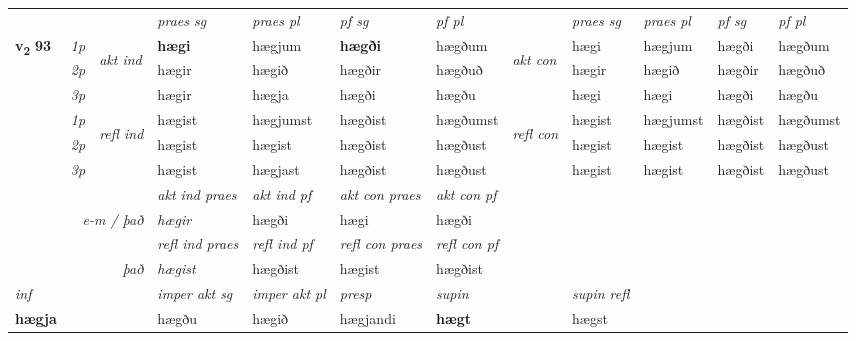 \begin{longtable}[l]{X>{\footnotesize\itshape}llXXXXlXXXX}
 & &   & \textit{praes sg}  & \textit{praes pl}    & \textit{ pf sg} & \textit{pf pl} & & \textit{praes sg}  & \textit{praes pl}    & \textit{pf sg} & \textit{pf pl }  \\ \cmidrule{4-7} \cmidrule{9-12}
 \multirow{2}{*}{{{\textbf{v{\textsubscript{2}}} \Large{\textbf{93}}}}}  & 1p & \multirow{3}{*}{\begin{turn}{90}\textit{akt ind}\end{turn}} & \textbf{hægi} & hægjum & \textbf{hægði} & hægðum & \multirow{3}{*}{\begin{turn}{90}\textit{akt con}\end{turn}} &hægi & hægjum & hægði & hægðum\\*
 & 2p &  &  hægir  & hægið & hægðir & hægðuð & & hægir & hægið & hægðir & hægðuð \\*
 & 3p &  & hægir & hægja & hægði & hægðu & & hægi & hægi& hægði & hægðu \\*
\cmidrule{4-7} \cmidrule{9-12}
 & 1p & \multirow{3}{*}{\begin{turn}{90}\textit{refl ind}\end{turn}}  & hægist & hægjumst & hægðist & hægðumst & \multirow{3}{*}{\begin{turn}{90}\textit{refl con}\end{turn}}  &hægist & hægjumst & hægðist & hægðumst \\*
 & 2p &  & hægist & hægist & hægðist & hægðust & &hægist & hægist & hægðist & hægðust \\*
 & 3p  & & hægist & hægjast & hægðist & hægðust & & hægist & hægist& hægðist & hægðust \\*
\cmidrule{4-7} \cmidrule{9-12}

   && &  \textit{akt ind praes} & \textit{akt ind pf} & \textit{akt con praes} & \textit{akt con pf} \\*
\multicolumn{3}{r}{\textit{e-m / það}} & hægir & hægði & hægi & hægði \\*

\cmidrule{4-7}
 & && \textit{refl ind praes} & \textit{refl ind pf} & \textit{refl con praes} & \textit{refl con pf} \\*
\multicolumn{3}{r}{\textit{það}}& hægist & hægðist & hægist & hægðist \\*

\cmidrule{4-7}
   {\textit{inf}} & &  & \textit{imper akt sg} & \textit{imper akt pl}   & \textit{presp} & \textit{supin} && \textit{supin refl}  \\*
  {\textbf{hægja}} & && hægðu  & hægið   & hægjandi &  \textbf{hægt} && hægst  \\*


\end{longtable}
